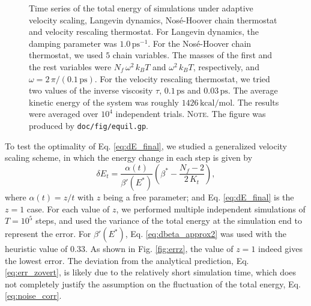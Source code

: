\documentclass[reprint]{revtex4-1}
\newcommand{\red}[1]{{\color{red} #1}}
\newcommand{\note}[1]{{\color{DarkGreen}\footnotesize \textsc{Note.} #1}}
\begin{document}
\begin{figure}[h]
\begin{center}
  \caption{
    \label{fig:equil}
    Time series of the total energy
    of simulations under
    adaptive velocity scaling,
    Langevin dynamics,
    Nos\'e-Hoover chain thermostat
    and
    velocity rescaling thermostat.
    For Langevin dynamics,
    the damping parameter was $1.0 \, \mathrm{ps}^{-1}$.
    For the Nos\'e-Hoover chain thermostat,
    we used $5$ chain variables. The masses
    of the first and the rest variables
    were $N_f \, \omega^2 \, k_B T$ and
    $\omega^2 \, k_B T$, respectively\cite{martyna1992},
    and
    $\omega = 2 \,\pi/(0.1 \, \mathrm{ps})$.
    For the velocity rescaling thermostat,
    we tried two values of the inverse viscosity $\tau$,
    $0.1 \, \mathrm{ps}$ and $0.03 \, \mathrm{ps}$.
    The average kinetic energy of the system
    was roughly $1426 \, \mathrm{kcal/mol}$.
    \red{The results were averaged over $10^4$ independent trials.}
    \note{The figure was produced by \texttt{doc/fig/equil.gp}.
    }%
  }
\end{center}
\end{figure}





To test the optimality of Eq. \eqref{eq:dE_final},
we studied a generalized velocity scaling scheme,
in which the energy change in each step is given by
%
\begin{equation}
  \delta E_t
  =
  \frac{ \alpha(t) } { \beta'(E^*) }
  \left(
   \beta^* -
   \frac{ N_f - 2 }
   { 2 \, K_t }
  \right)
  ,
  \label{eq:dE_mod}
\end{equation}
%
where $\alpha(t) = z/t$ with $z$ being a free parameter;
and Eq. \eqref{eq:dE_final} is the $z = 1$ case.
%
For each value of $z$,
we performed multiple independent simulations of $T = 10^5$ steps,
and used the variance of the total energy at the simulation end
to represent the error.
%
For $\beta'(E^*)$,
Eq. \eqref{eq:dbeta_approx2} was used with the heuristic value of $0.33$.
%
As shown in Fig. \ref{fig:errz},
the value of $z = 1$
indeed gives the lowest error.
%
The deviation from the analytical prediction,
Eq. \eqref{eq:err_zovert},
is likely due to the relatively short simulation time,
which does not completely justify the assumption
on the fluctuation of the total energy, Eq. \eqref{eq:noise_corr}.
\end{document}
